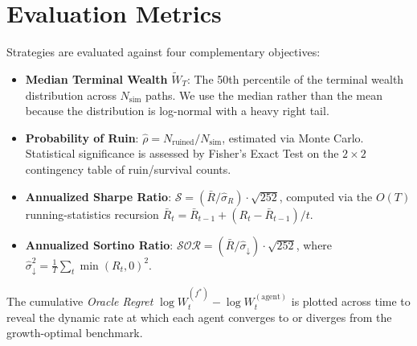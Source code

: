 \section{Evaluation Metrics}

Strategies are evaluated against four complementary objectives:

\begin{itemize}
    \item \textbf{Median Terminal Wealth} $\tilde W_T$: The 50th percentile
    of the terminal wealth distribution across $N_{\text{sim}}$ paths.  We
    use the median rather than the mean because the distribution is
    log-normal with a heavy right tail.

    \item \textbf{Probability of Ruin}:
    $\hat\rho = N_{\text{ruined}} / N_{\text{sim}}$, estimated via Monte
    Carlo.  Statistical significance is assessed by Fisher's Exact Test
    on the $2 \times 2$ contingency table of ruin/survival counts.

    \item \textbf{Annualized Sharpe Ratio}:
    $\mathcal{S} = (\bar R / \hat\sigma_R) \cdot \sqrt{252}$,
    computed via the $O(T)$ running-statistics recursion
    $\bar R_t = \bar R_{t-1} + (R_t - \bar R_{t-1})/t$.

    \item \textbf{Annualized Sortino Ratio}:
    $\mathcal{SOR} = (\bar R / \hat\sigma_{\downarrow}) \cdot \sqrt{252}$,
    where $\hat\sigma_{\downarrow}^2 = \frac{1}{T}\sum_t \min(R_t, 0)^2$.
\end{itemize}

The cumulative \emph{Oracle Regret} $\log W_t^{(f^*)} - \log W_t^{(\text{agent})}$
is plotted across time to reveal the dynamic rate at which each agent
converges to or diverges from the growth-optimal benchmark.
